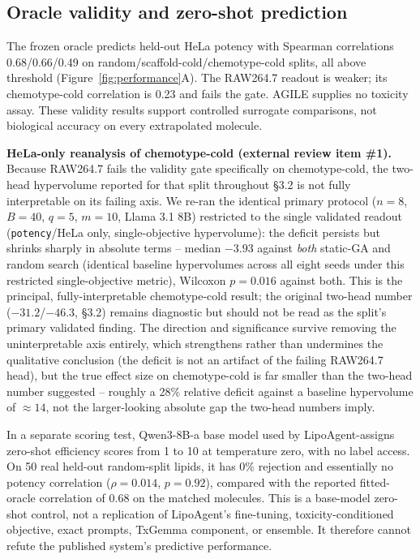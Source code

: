 \documentclass{article}
\begin{document}
\subsection{Oracle validity and zero-shot prediction}
The frozen oracle predicts held-out HeLa potency with Spearman correlations 0.68/0.66/0.49 on random/scaffold-cold/chemotype-cold splits, all above threshold (Figure~\ref{fig:performance}A). The RAW264.7 readout is weaker; its chemotype-cold correlation is 0.23 and fails the gate. AGILE supplies no toxicity assay. These validity results support controlled surrogate comparisons, not biological accuracy on every extrapolated molecule.

\textbf{HeLa-only reanalysis of chemotype-cold (external review item \#1).} Because RAW264.7 fails the validity gate specifically on chemotype-cold, the two-head hypervolume reported for that split throughout \S3.2 is not fully interpretable on its failing axis. We re-ran the identical primary protocol ($n=8$, $B=40$, $q=5$, $m=10$, Llama 3.1 8B) restricted to the single validated readout (\texttt{potency}/HeLa only, single-objective hypervolume): the deficit persists but shrinks sharply in absolute terms -- median $-3.93$ against \emph{both} static-GA and random search (identical baseline hypervolumes across all eight seeds under this restricted single-objective metric), Wilcoxon $p=0.016$ against both. This is the principal, fully-interpretable chemotype-cold result; the original two-head number ($-31.2$/$-46.3$, \S3.2) remains diagnostic but should not be read as the split's primary validated finding. The direction and significance survive removing the uninterpretable axis entirely, which strengthens rather than undermines the qualitative conclusion (the deficit is not an artifact of the failing RAW264.7 head), but the true effect size on chemotype-cold is far smaller than the two-head number suggested -- roughly a 28\% relative deficit against a baseline hypervolume of $\approx14$, not the larger-looking absolute gap the two-head numbers imply.

In a separate scoring test, Qwen3-8B-a base model used by LipoAgent-assigns zero-shot efficiency scores from 1 to 10 at temperature zero, with no label access. On 50 real held-out random-split lipids, it has 0\% rejection and essentially no potency correlation ($\rho=0.014$, $p=0.92$), compared with the reported fitted-oracle correlation of 0.68 on the matched molecules. This is a base-model zero-shot control, not a replication of LipoAgent's fine-tuning, toxicity-conditioned objective, exact prompts, TxGemma component, or ensemble. It therefore cannot refute the published system's predictive performance.
\end{document}
